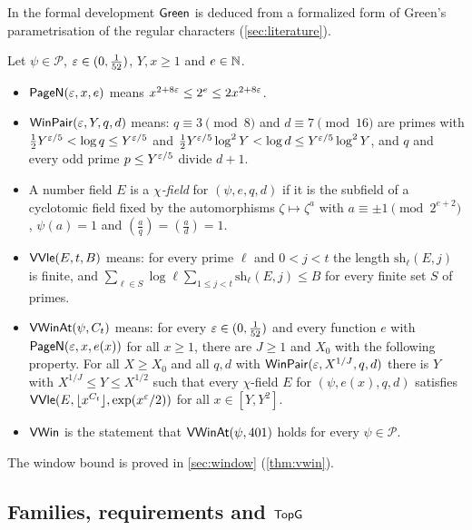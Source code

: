 In the formal development $\mathsf{Green}$ is deduced from a formalized form of Green's
parametrisation of the regular characters (\cref{sec:literature}).

\begin{definition}\label{def:vwin}
Let $\psi\in\mathcal P$, $\varepsilon\in(0,\frac1{52})$, $Y,x\ge1$ and $e\in\mathbb{N}$.
\begin{itemize}
\item $\mathsf{PageN}(\varepsilon,x,e)$ means $x^{2+8\varepsilon}\le2^e\le2x^{2+8\varepsilon}$.
\item $\mathsf{WinPair}(\varepsilon,Y,q,d)$ means: $q\equiv3\pmod 8$ and $d\equiv7\pmod{16}$ are primes with
$\frac12Y^{\varepsilon/5}<\log q\le Y^{\varepsilon/5}$ and $\frac12Y^{\varepsilon/5}\log^2Y<\log d\le Y^{\varepsilon/5}\log^2Y$, and
$q$ and every odd prime $p\le Y^{\varepsilon/5}$ divide $d+1$.
\item A number field $E$ is a \emph{$\chi$-field} for $(\psi,e,q,d)$ if it is the subfield of a cyclotomic
field fixed by the automorphisms $\zeta\mapsto\zeta^a$ with $a\equiv\pm1\pmod{2^{e+2}}$, $\psi(a)=1$
and $(\frac aq)=(\frac ad)=1$.
\item $\mathsf{VVle}(E,t,B)$ means: for every prime $\ell$ and $0<j<t$ the length
$\mathrm{sh}_\ell(E,j)$ is finite, and $\sum_{\ell\in S}\log\ell\sum_{1\le j<t}\mathrm{sh}_\ell(E,j)\le B$
for every finite set $S$ of primes.
\item $\mathsf{VWinAt}(\psi,C_t)$ means: for every $\varepsilon\in(0,\frac1{52})$ and every function $e$ with
$\mathsf{PageN}(\varepsilon,x,e(x))$ for all $x\ge1$, there are $J\ge1$ and $X_0$ with the following
property. For all $X\ge X_0$ and all $q,d$ with $\mathsf{WinPair}(\varepsilon,X^{1/J},q,d)$ there is $Y$ with
$X^{1/J}\le Y\le X^{1/2}$ such that every $\chi$-field $E$ for $(\psi,e(x),q,d)$ satisfies
$\mathsf{VVle}(E,\lfloor x^{C_t}\rfloor,\exp(x^\varepsilon/2))$ for all $x\in[Y,Y^2]$.
\item $\mathsf{VWin}$ is the statement that $\mathsf{VWinAt}(\psi,401)$ holds for every $\psi\in\mathcal P$.
\end{itemize}
\end{definition}

The window bound is proved in \cref{sec:window} (\cref{thm:vwin}).

\subsection{Families, requirements and \texorpdfstring{$\mathsf{TopG}$}{TopG}}

